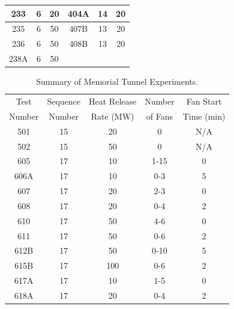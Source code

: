 \begin{table}[p]
\begin{center}
\begin{tabular}{|c|c|c||c|c|c|}
233     &   6      &  20              & 404A    &   14     &  20           \\ \hline
235     &   6      &  50              & 407B    &   13     &  20           \\ \hline
236     &   6      &  50              & 408B    &   13     &  20           \\ \hline
238A    &   6      &  50     & \multicolumn{3}{c|}{ \hspace{.1in}}            \\ \hline
\end{tabular}
\end{center}
\label{tab:Memorial_Test_Matrix_Transverse}
\end{table}


\begin{table}[!ht]
\caption[Summary of Memorial Tunnel Experiments]{Summary of Memorial Tunnel Experiments.}
\begin{center}
\begin{tabular}{|c|c|c|c|c|}
\hline
Test     & Sequence & Heat Release  & Number   & Fan Start   \\
Number   & Number   & Rate (MW)     & of Fans  & Time (min)  \\ \hline \hline
501      & 15       & 20            & 0        & N/A         \\ \hline
502      & 15       & 50            & 0        & N/A         \\ \hline
605      & 17       & 10            & 1-15     & 0           \\ \hline
606A     & 17       & 10            & 0-3      & 5           \\ \hline
607      & 17       & 20            & 2-3      & 0           \\ \hline
608      & 17       & 20            & 0-4      & 2           \\ \hline
610      & 17       & 50            & 4-6      & 0           \\ \hline
611      & 17       & 50            & 0-6      & 2           \\ \hline
612B     & 17       & 50            & 0-10     & 5           \\ \hline
615B     & 17       & 100           & 0-6      & 2           \\ \hline
617A     & 17       & 10            & 1-5      & 0           \\ \hline
618A     & 17       & 20            & 0-4      & 2           \\ \hline

\end{tabular}
\end{center}
\end{table}
